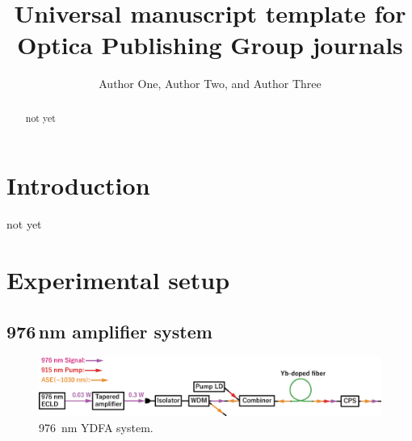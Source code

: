 \documentclass{osa-article}
\begin{document}
\title{Universal manuscript template for Optica Publishing Group journals}

\author{Author One, Author Two, and Author Three}

\address{Reserch Institute for Interdisciplinary Science, Okayama University, Okayama, Japan}




\begin{abstract}
not yet
\end{abstract}

\section{Introduction}
not yet

\section{Experimental setup}
\subsection{976\,nm amplifier system}

\begin{figure}[h!]
\centering\includegraphics[width=\linewidth]{./Figure/976nmYDFASystem.eps}
\caption{\SI{976}{nm} YDFA system.}
\label{fig:976YDFASystem}
\end{figure}
\end{document}
